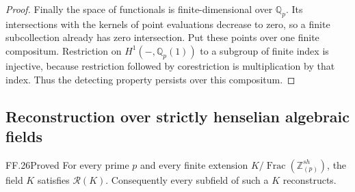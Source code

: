\begin{proof}
Finally the space of functionals is finite-dimensional
over \(\mathbb Q_p\). Its intersections with the
kernels of point evaluations decrease to zero, so a
finite subcollection already has zero intersection.
Put these points over one finite compositum. Restriction
on \(H^1(-,\mathbb Q_p(1))\) to a subgroup of finite
index is injective, because restriction followed by
corestriction is multiplication by that index. Thus
the detecting property persists over this compositum.
\end{proof}

\subsection{Reconstruction over strictly henselian algebraic fields}

\begin{claim}{FF.26}{Proved}\label{clm:FFstrictreconstruct}
For every prime \(p\) and every finite extension
\(K/\operatorname{Frac}(\mathbb Z_{(p)}^{sh})\),
the field \(K\) satisfies \(\mathcal R(K)\).
Consequently every subfield of such a \(K\) reconstructs.
\end{claim}

